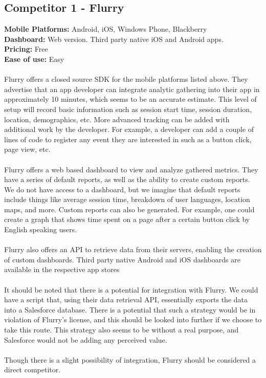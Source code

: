\documentclass[12pt,oneside,letterpaper]{article}
\begin{document}
\subsection{Competitor 1 - Flurry}
\textbf{Mobile Platforms:} Android, iOS, Windows Phone, Blackberry\\
\textbf{Dashboard:} Web version. Third party native iOS and Android apps.\\
\textbf{Pricing:} Free\\
\textbf{Ease of use:} Easy\\
\\
Flurry offers a closed source SDK for the mobile platforms listed above. They advertise that an app developer can integrate analytic gathering into their app in approximately 10 minutes, which seems to be an accurate estimate. This level of setup will record basic information such as session start time, session duration, location, demographics, etc. More advanced tracking can be added with additional work by the developer. For example, a developer can add a couple of lines of code to register any event they are interested in such as a button click, page view, etc.\\\\
Flurry offers a web based dashboard to view and analyze gathered metrics. They have a series of default reports, as well as the ability to create custom reports. We do not have access to a dashboard, but we imagine that default reports include things like average session time, breakdown of user languages, location maps, and more. Custom reports can also be generated. For example, one could create a graph that shows time spent on a page after a certain button click by English speaking users.\\\\
Flurry also offers an API to retrieve data from their servers, enabling the creation of custom dashboards. Third party native Android and iOS dashboards are available in the respective app stores\\\\
It should be noted that there is a potential for integration with Flurry. We could have a script that, using their data retrieval API, essentially exports the data into a Salesforce database. There is a potential that such a strategy would be in violation of Flurry's license, and this should be looked into further if we choose to take this route. This strategy also seems to be without a real purpose, and Salesforce would not be adding any perceived value.\\\\
Though there is a slight possibility of integration, Flurry should be considered a direct competitor.
\end{document}
